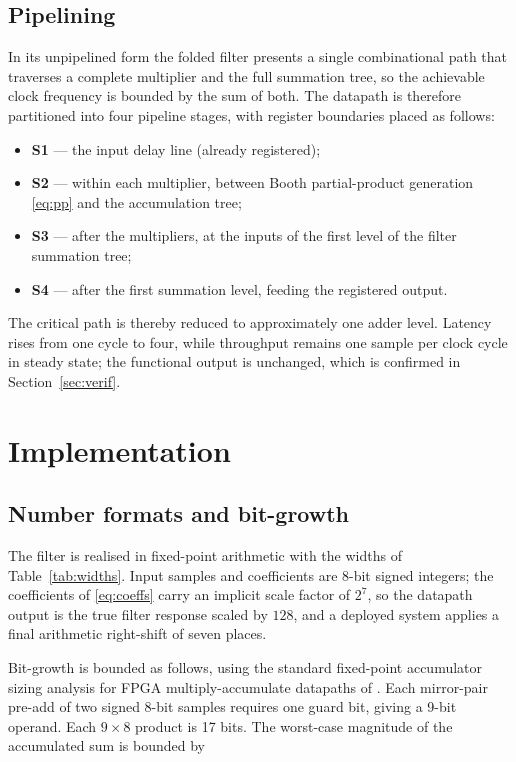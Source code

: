 \documentclass[conference]{IEEEtran}
\begin{document}
\subsection{Pipelining}
\label{subsec:pipe}

In its unpipelined form the folded filter presents a single
combinational path that traverses a complete multiplier and the full
summation tree, so the achievable clock frequency is bounded by the sum
of both. The datapath is therefore partitioned into four pipeline
stages, with register boundaries placed as follows:

\begin{itemize}
  \item \textbf{S1} --- the input delay line (already registered);
  \item \textbf{S2} --- within each multiplier, between Booth
  partial-product generation \eqref{eq:pp} and the accumulation tree;
  \item \textbf{S3} --- after the multipliers, at the inputs of the
  first level of the filter summation tree;
  \item \textbf{S4} --- after the first summation level, feeding the
  registered output.
\end{itemize}

The critical path is thereby reduced to approximately one adder level.
Latency rises from one cycle to four, while throughput remains one
sample per clock cycle in steady state; the functional output is
unchanged, which is confirmed in Section~\ref{sec:verif}.

\section{Implementation}
\label{sec:impl}

\subsection{Number formats and bit-growth}

The filter is realised in fixed-point arithmetic with the widths of
Table~\ref{tab:widths}. Input samples and coefficients are 8-bit signed
integers; the coefficients of \eqref{eq:coeffs} carry an implicit scale
factor of $2^7$, so the datapath output is the true filter response
scaled by $128$, and a deployed system applies a final arithmetic
right-shift of seven places.

Bit-growth is bounded as follows, using the standard fixed-point
accumulator sizing analysis for FPGA multiply-accumulate datapaths of
\cite{paz}. Each mirror-pair pre-add of two
signed 8-bit samples requires one guard bit, giving a 9-bit operand.
Each $9 \times 8$ product is 17 bits. The worst-case magnitude of the
accumulated sum is bounded by
\end{document}
